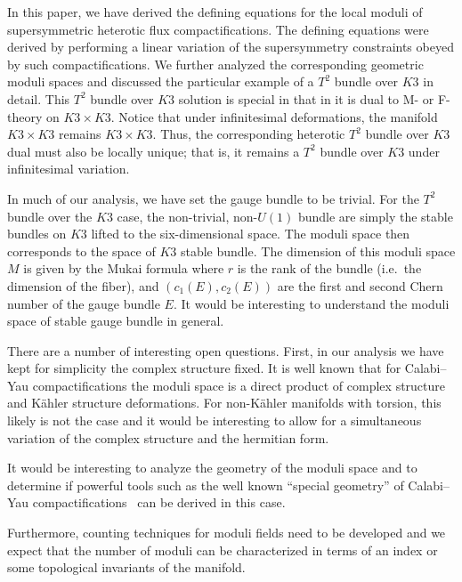 


In this paper, we have derived the defining equations for the
local moduli of supersymmetric heterotic flux compactifications.
The defining equations were derived by performing a linear
variation of the supersymmetry constraints obeyed by such
compactifications. We further analyzed the corresponding geometric
moduli spaces and discussed the particular example of a $T^2$
bundle over $K3$ in detail. This $T^2$ bundle over $K3$ solution
is special in that in it is dual to M- or F-theory on $K3\times
K3$.  Notice that under infinitesimal deformations, the manifold
$K3\times K3$ remains $K3\times K3$.  Thus, the corresponding
heterotic $T^2$ bundle over $K3$ dual must also be locally unique;
that is, it remains a $T^2$ bundle over $K3$ under infinitesimal
variation.


In much of our analysis, we have set the gauge bundle to be
trivial.  For the $T^2$ bundle over the $K3$ case, the
non-trivial, non-$U(1)$ bundle are simply the stable bundles on
$K3$ lifted to the six-dimensional space.  The moduli space then
corresponds to the space of $K3$ stable bundle.  The dimension of
this moduli space $M$ is given by the Mukai formula \Mukai
\eqn{} where $r$ is the rank of the bundle (i.e.~the dimension of
the fiber), and $(c_1(E), c_2(E))$ are the first and second Chern
number of the gauge bundle $E$.  It would be interesting to
understand the moduli space of stable gauge bundle in general.

There are a number of interesting open questions. First, in our
analysis we have kept for simplicity the complex structure fixed.
It is well known that for Calabi--Yau compactifications the moduli
space is a direct product of complex structure and K\"ahler
structure deformations.  For non-K\"ahler manifolds with torsion,
this likely is not the case and it would be interesting to allow
for a simultaneous variation of the complex structure and the
hermitian form.

It would be interesting to analyze the geometry of the moduli space
and to determine if powerful tools such as the well known ``special
geometry'' of Calabi--Yau compactifications \ can
be derived in this case.

Furthermore, counting techniques for moduli fields need to be
developed and we expect that the number of moduli can be
characterized in terms of an index or some topological invariants of the manifold.

